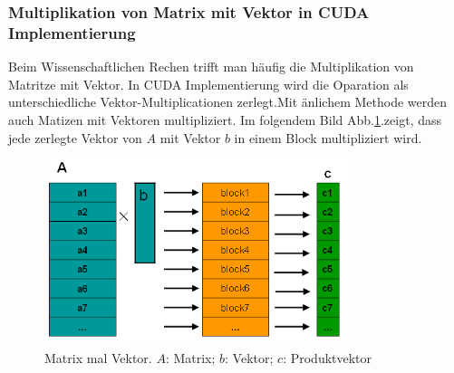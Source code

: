 \subsubsection{Multiplikation von Matrix mit Vektor in CUDA Implementierung}

Beim Wissenschaftlichen Rechen trifft man häufig die Multiplikation von Matritze mit Vektor. In CUDA Implementierung wird die Oparation als unterschiedliche Vektor-Multiplicationen zerlegt.Mit änlichem Methode werden auch Matizen mit Vektoren multipliziert. Im folgendem Bild Abb.\ref{MatrixVektor}.zeigt, dass jede zerlegte Vektor von $A$ mit Vektor $b$ in einem Block multipliziert wird.

\begin{figure}[htbp]
\includegraphics[width=3.5in]{../xby/pic//MatrixVektor}
\caption{Matrix mal Vektor. $A$: Matrix; $b$: Vektor; $c$: Produktvektor}
\label{MatrixVektor}
\end{figure}